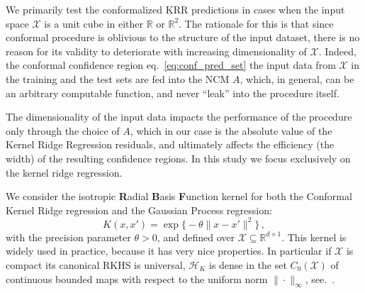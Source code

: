 \documentclass{ITaSconf}
\newcommand{\Hcal}{\mathcal{H}}
\newcommand{\Xcal}{\mathcal{X}}
\newcommand{\Real}{\mathbb{R}}
\begin{document}
We primarily test the conformalized KRR predictions in cases when the input space
$\Xcal$ is a unit cube in either $\Real$ or $\Real^2$. The rationale for this is
that since conformal procedure is oblivious to the structure of the input dataset,
there is no reason for its validity to deteriorate with increasing dimensionality
of $\Xcal$. Indeed, the conformal confidence region eq.~\ref{eq:conf_pred_set} the
input data from $\Xcal$ in the training and the test sets are fed into the NCM $A$,
which, in general, can be an arbitrary computable function, and never ``leak'' into
the procedure itself.

The dimensionality of the input data impacts the performance of the procedure only
through the choice of $A$, which in our case is the absolute value of the Kernel
Ridge Regression residuals, and ultimately affects the efficiency (the width) of
the resulting confidence regions. In this study we focus exclusively on the kernel
ridge regression.

We consider the isotropic \textbf{R}adial \textbf{B}asis \textbf{F}unction kernel
for both the Conformal Kernel Ridge regression and the Gaussian Process regression:
\begin{equation*}
  K(x,x')
  = \mathop{\text{exp}}\bigl\{-\theta \|x - x'\|^2\bigr\}
  \,,
\end{equation*}
with the precision parameter $\theta>0$, and defined over $\Xcal \subseteq \Real^{d\times 1}$.
This kernel is widely used in practice, because it has very nice properties. In
particular if $\Xcal$ is compact its canonical RKHS is universal, $\Hcal_K$ is dense
in the set $C_0(\Xcal)$ of continuous bounded maps with respect to the uniform norm
$\|\cdot\|_\infty$, see.~\cite{rbf_universal}.

\end{document}
